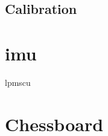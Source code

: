 \subsection{Calibration}

\section{\acrlong{imu}}
\label{appendix:cha2:imu}
\acrfull{lpmscu}

\section{Chessboard}
\label{appendix:cha2:chessboard}

